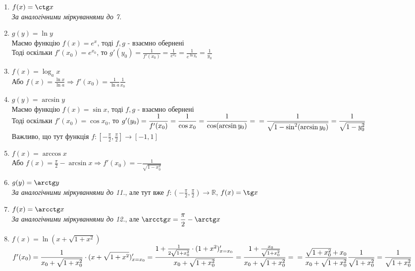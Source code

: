 \documentclass[a4paper, 14pt]{article}
\theoremstyle{theoremdd}
\theoremstyle{theoremdd}
\theoremstyle{theoremdd}
\theoremstyle{theoremdd}
\theoremstyle{theoremdd}
\theoremstyle{theoremdd}
\theoremstyle{theoremdd}
\theoremstyle{theoremdd}
\begin{document}
\begin{enumerate}[wide=0pt,label={\arabic*)}]
\item $f(x) = \ctg x$\\
\textit{За аналогічними міркуваннями до 7.}

\item $g(y) = \ln y$\\
Маємо функцію $f(x) = e^x$, тоді $f,g$ - взаємно обернені\\
Тоді оскільки $f'(x_0) = e^{x_0}$, то $g'(y_0) = \displaystyle \frac{1}{f'(x_0)} = \frac{1}{e^{x_0}} = \frac{1}{e^{\ln y_0}} = \frac{1}{y_0}$

\item $f(x) = \log_a x$\\
Або $f(x) = \displaystyle \frac{\ln x}{\ln a} \Rightarrow f'(x_0) = \frac{1}{\ln a} \frac{1}{x_0}$

\item $g(y) = \arcsin y$\\
Маємо функцію $f(x) = \sin x$, тоді $f,g$ - взаємно обернені\\
Тоді оскільки $f'(x_0) = \cos x_0$, то $g'(y_0) = \displaystyle \frac{1}{f'(x_0)} = \frac{1}{\cos x_0}= \frac{1}{\cos (\arcsin y_0)} = \\ = \frac{1}{\sqrt{1- \sin^2(\arcsin y_0)}} = \frac{1}{\sqrt{1-y_0^2}}$\\
Важливо, що тут функція $f: \displaystyle \left[-\frac{\pi}{2},\frac{\pi}{2}\right] \to [-1,1]$

\item $f(x) = \arccos x$\\
Або $f(x) = \displaystyle \frac{\pi}{2} - \arcsin x \Rightarrow f'(x_0) = - \frac{1}{\sqrt{1-x_0^2}}$

\item $g(y) = \arctg y$\\
\textit{За аналогічними міркуваннями до 11.}, але тут вже $f: \displaystyle \left(-\frac{\pi}{2},\frac{\pi}{2}\right) \to \mathbb{R}$, $f(x) = \tg x$

\item $f(x) = \arcctg x$\\
\textit{За аналогічними міркуваннями до 12.}, але $\arcctg x = \displaystyle \frac{\pi}{2} - \arctg x$

\item $f(x) = \ln(x + \sqrt{1+x^2})$\\
$f'(x_0) = \displaystyle \frac{1}{x_0+ \sqrt{1+x_0^2}} \cdot (x+ \sqrt{1+x^2})'_{x = x_0} = \frac{1+ \frac{1}{2\sqrt{1+x_0^2}} \cdot (1+x^2)'_{x=x_0}}{x_0+ \sqrt{1+x_0^2}} = \frac{1+ \frac{x_0}{\sqrt{1+x_0^2}}}{x_0 + \sqrt{1+x_0^2}} = \\ = \frac{\sqrt{1+x_0^2}+x_0}{x_0 + \sqrt{1 + x_0^2}} \frac{1}{\sqrt{1+x_0^2}} = \frac{1}{\sqrt{1+x_0^2}}$
\end{enumerate}
\end{document}
